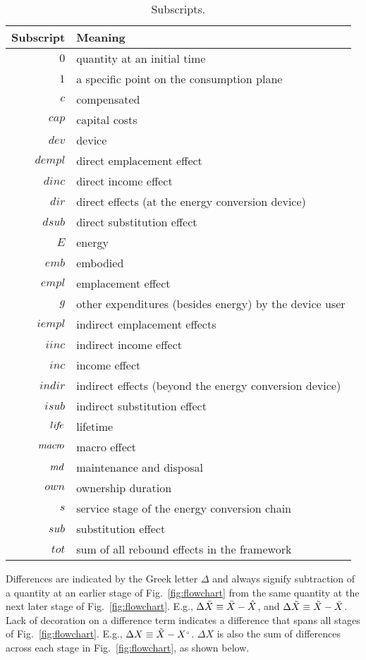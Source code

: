 \begin{table}
\footnotesize
\centering
\caption{Subscripts.}
\begin{tabular}{r l}
  \toprule
  Subscript & Meaning \\
  \midrule
  $0$      & quantity at an initial time \\
  $1$      & a specific point on the consumption plane \\
  $c$      & compensated \\
  $cap$    & capital costs \\
  $dev$    & device \\
  $dempl$  & direct emplacement effect \\
  $dinc$   & direct income effect \\
  $dir$    & direct effects (at the energy conversion device) \\
  $dsub$   & direct substitution effect \\
  $E$      & energy \\
  $emb$    & embodied \\
  $empl$   & emplacement effect \\
  $g$      & other expenditures (besides energy) by the device user \\
  $iempl$  & indirect emplacement effects \\
  $iinc$   & indirect income effect \\
  $inc$    & income effect \\
  $indir$  & indirect effects (beyond the energy conversion device) \\
  $isub$   & indirect substitution effect \\
  $li\!f\!e$  & lifetime \\
  $macr\!o$ & macro effect \\
  $md$    & maintenance and disposal \\
  $own$    & ownership duration \\
  $s$      & service stage of the energy conversion chain \\
  $sub$    & substitution effect \\
  $tot$    & sum of all rebound effects in the framework \\
  \bottomrule
\end{tabular}
\label{tab:subscripts}
\end{table}


Differences are indicated by the Greek letter $\Delta$ and always
signify subtraction of a quantity at an earlier stage of Fig.~\ref{fig:flowchart}
from the same quantity at the next later stage of Fig.~\ref{fig:flowchart}.
E.g.,
$\Delta \bar{X} \equiv \bar{X} - \hat{X}$, and
$\Delta \tilde{X} \equiv \tilde{X} - \bar{X}$.
Lack of decoration on a difference term indicates a difference that spans all stages of Fig.~\ref{fig:flowchart}.
E.g., $\Delta X \equiv \tilde{X} - {}{X}^{\scriptscriptstyle \circ}$.
$\Delta X$ is also the sum of differences across each stage in Fig.~\ref{fig:flowchart},
as shown below.

